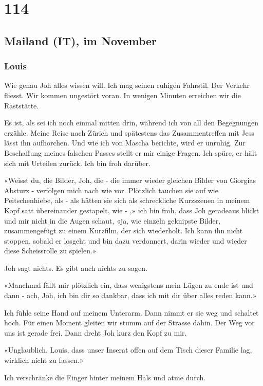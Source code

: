 \chapter{114}

\section{Mailand (IT), im November}

\subsection{Louis}

Wie genau Joh alles wissen will.
Ich mag seinen ruhigen Fahrstil. Der Verkehr fliesst. Wir kommen
ungestört voran. In wenigen Minuten erreichen wir die 
Raststätte.

Es ist, als sei ich noch einmal mitten drin, während ich von all den
Begegnungen erzähle. Meine Reise nach Zürich und spätestens das
Zusammentreffen mit Jess lässt ihn aufhorchen. Und wie ich von Mascha
berichte, wird er unruhig. Zur Beschaffung meines falschen Passes stellt
er mir einige Fragen. Ich spüre, er hält sich mit Urteilen zurück. Ich
bin froh darüber.

«Weisst du, die Bilder, Joh, die - die immer wieder gleichen Bilder von Giorgias Absturz - verfolgen mich nach wie vor. Plötzlich tauchen sie auf wie Peitschenhiebe, als - als hätten sie sich als schreckliche Kurzszenen in meinem Kopf satt übereinander gestapelt, wie - ,» ich bin froh, dass Joh geradeaus blickt und mir nicht in die Augen schaut, «ja, wie einzeln geknipste Bilder, zusammengefügt zu einem
Kurzfilm, der sich wiederholt. Ich kann ihn nicht stoppen, sobald er
losgeht und bin dazu verdonnert, darin wieder und wieder diese Scheissrolle zu
spielen.»

Joh sagt nichts. Es gibt auch nichts zu sagen.

«Manchmal fällt mir plötzlich ein, dass wenigstens mein Lügen zu ende ist und dann - ach, Joh, ich bin dir so dankbar, dass ich mit dir über alles reden kann.»

Ich fühle seine Hand auf meinem Unterarm. Dann nimmt er sie weg und schaltet hoch. Für einen Moment gleiten wir stumm auf der Strasse dahin. Der Weg vor uns ist gerade frei. Dann dreht Joh kurz den Kopf zu mir.

«Unglaublich, Louis, dass unser Inserat offen auf dem Tisch dieser
Familie lag, wirklich nicht zu fassen.»

Ich verschränke die Finger hinter meinem Hals und atme durch.

